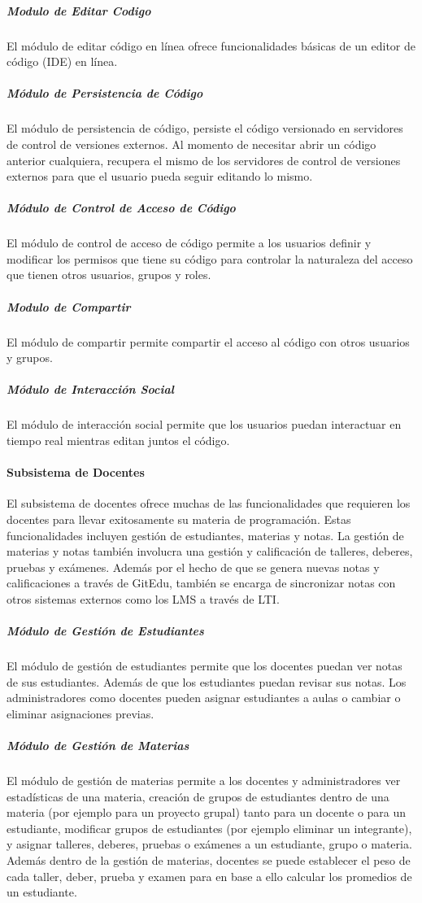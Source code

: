 \subparagraph{Modulo de Editar Codigo}
El módulo de editar código en línea ofrece funcionalidades básicas de un editor de código (IDE) en línea.

\subparagraph{Módulo de Persistencia de Código}
El módulo de persistencia de código, persiste el código versionado en servidores de control de versiones externos. Al momento de necesitar abrir un código anterior cualquiera, recupera el mismo de los servidores de control de versiones externos para que el usuario pueda seguir editando lo mismo.

\subparagraph{Módulo de Control de Acceso de Código}
El módulo de control de acceso de código permite a los usuarios definir y modificar los permisos que tiene su código para controlar la naturaleza del acceso que tienen otros usuarios, grupos y roles.

\subparagraph{Modulo de Compartir}
El módulo de compartir permite compartir el acceso al código con otros usuarios y grupos.

\subparagraph{Módulo de Interacción Social}
El módulo de interacción social permite que los usuarios puedan interactuar en tiempo real mientras editan juntos el código.

\paragraph{Subsistema de Docentes}
El subsistema de docentes ofrece muchas de las funcionalidades que requieren los docentes para llevar exitosamente su materia de programación. Estas funcionalidades incluyen gestión de estudiantes, materias y notas. La gestión de materias y notas también involucra una gestión y calificación de talleres, deberes, pruebas y exámenes. Además por el hecho de que se genera nuevas notas y calificaciones a través de GitEdu, también se encarga de sincronizar notas con otros sistemas externos como los LMS  a través de LTI.

\subparagraph{Módulo de Gestión de Estudiantes}
El módulo de gestión de estudiantes permite que los docentes puedan ver notas de sus estudiantes. Además de que los estudiantes puedan revisar sus notas. Los administradores como docentes pueden asignar estudiantes a aulas o cambiar o eliminar asignaciones previas.

\subparagraph{Módulo de Gestión de Materias}
El módulo de gestión de materias permite a los docentes y administradores ver estadísticas de una materia, creación de grupos de estudiantes dentro de una materia (por ejemplo para un proyecto grupal) tanto para un docente o para un estudiante, modificar grupos de estudiantes (por ejemplo eliminar un integrante), y asignar talleres, deberes, pruebas o exámenes a un estudiante, grupo o materia. Además dentro de la gestión de materias, docentes se puede establecer el peso de cada taller, deber, prueba y examen para en base a ello calcular los promedios de un estudiante.

